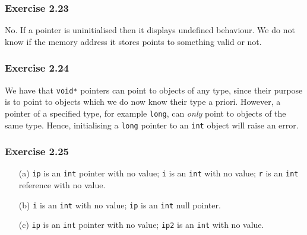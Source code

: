 \documentclass[12pt, a4paper]{article}
\begin{document}
\subsubsection*{Exercise 2.23}
No. If a pointer is uninitialised then it displays undefined behaviour. We do not know if the memory address it stores points to something valid or not.

\subsubsection*{Exercise 2.24}
We have that \texttt{void*} pointers can point to objects of any type, since their purpose is to point to objects which we do now know their type a priori. However, a pointer of a specified type, for example \texttt{long}, can \textit{only} point to objects of the same type. Hence, initialising a \texttt{long} pointer to an \texttt{int} object will raise an error.

\subsubsection*{Exercise 2.25}
\begin{itemize}
	\item [(a)]
		\texttt{ip} is an \texttt{int} pointer with no value; \texttt{i} is an \texttt{int} with no value; \texttt{r} is an \texttt{int} reference with no value.
	\item [(b)]
		\texttt{i} is an \texttt{int} with no value; \texttt{ip} is an \texttt{int} null pointer.
	\item [(c)]
		\texttt{ip} is an \texttt{int} pointer with no value; \texttt{ip2} is an \texttt{int} with no value.
\end{itemize}
\end{document}
